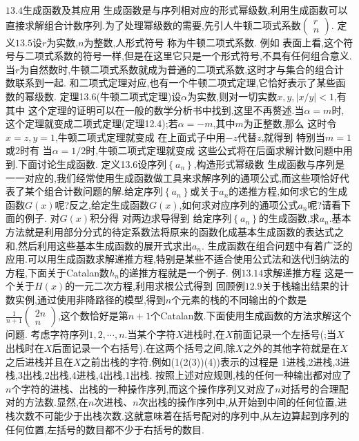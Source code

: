 {$13.4$生成函数及其应用}
生成函数是与序列相对应的形式幂级数,利用生成函数可以直接求解组合计数序列.为了处理幂级数的需要,先引人牛顿二项式系数$\left(\begin{array}{l}r\\n\end{array}\right)$.
定义$13.5$设$r$为实数,$n$为整数,人形式符号
称为牛顿二项式系数.
例如
表面上看,这个符号与二项式系数的符号一样,但是在这里它只是一个形式符号,不具有任何组合意义.当$r$为自然数时,牛顿二项式系数就成为普通的二项式系数,这时才与集合的组合计数联系到一起.
和二项式定理对应,也有一个牛顿二项式定理,它恰好表示了某些函数的幂级数.
定理13.6(牛顿二项式定理)设$\alpha$为实数,则对一切实数$x,y,|x/y|<1$,有
其中
这个定理的证明可以在一般的数学分析书中找到,这里不再赘述.当$\alpha=m$时,这个定理就变成二项式定理(定理12.4);若$\alpha=-m$,其中$m$为正整数,那么
这时令$x=z,y=1$,牛顿二项式定理就变成
在上面式子中用$-z$代替$z$,就得到
特别当$m=1$或2时有
当$\alpha=1/2$时,牛顿二项式定理就变成
这些公式将在后面求解计数问题中用到.下面讨论生成函数.
定义13.6设序列$\left\{a_{n}\right\}$,构造形式幂级数
生成函数与序列是一一对应的,我们经常使用生成函数做工具来求解序列的通项公式,而这些项恰好代表了某个组合计数问题的解.给定序列$\left\{a_{n}\right\}$或关于$a_{n}$的递推方程,如何求它的生成函数$G(x)$呢?反之,给定生成函数$G(x)$,如何求对应序列的通项公式$a_{n}$呢?请看下面的例子.
对$G(x)$积分得
对两边求导得到
给定序列$\left\{a_{n}\right\}$的生成函数,求$a_{n}$.基本方法就是利用部分分式的待定系数法将原来的函数化成基本生成函数的表达式之和,然后利用这些基本生成函数的展开式求出$a_{n}$.
生成函数在组合问题中有着广泛的应用.可以用生成函数求解递推方程,特别是某些不适合使用公式法和迭代归纳法的方程,下面关于Catalan数$h_{n}$的递推方程就是一个例子.
例$13.14$求解递推方程
这是一个关于$H(x)$的一元二次方程,利用求根公式得到
回顾例$12.9$关于栈输出结果的计数实例,通过使用非降路径的模型,得到$n$个元素的栈的不同输出的个数是$\frac{1}{n+1}\left(\begin{array}{c}2n\\n\end{array}\right)$,这个数恰好是第$n+1$个Catalan数.下面使用生成函数的方法求解这个问题.
考虑字符序列$1,2,\cdots,n$.当某个字符$X$进栈时,在$X$前面记录一个左括号(;当$X$出栈时在$X$后面记录一个右括号).在这两个括号之间,除$X$之外的其他字符就是在$X$之后进栈并且在$X$之前出栈的字符.例如(1(2(3))(4))表示的过程是
1进栈,2进栈,3进栈,3出栈,2出栈,4进栈,4出栈,1出栈.
按照上述对应规则,栈的任何一种输出都对应了$n$个字符的进栈、出栈的一种操作序列,而这个操作序列又对应了$n$对括号的合理配对的方法数.显然,在$n$次进栈、$n$次出栈的操作序列中,从开始到中间的任何位置,进栈次数不可能少于出栈次数.这就意味着在括号配对的序列中,从左边算起到序列的任何位置,左括号的数目都不少于右括号的数目.
